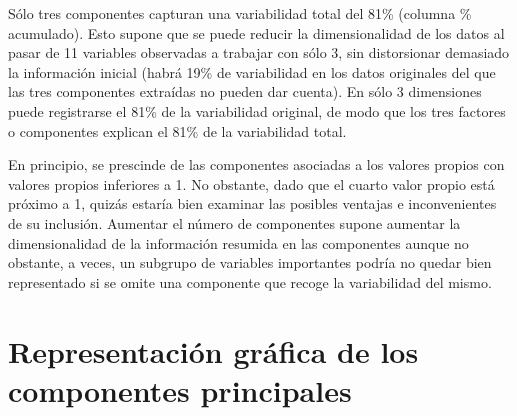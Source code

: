 \documentclass[12pt,twoside]{report}
\begin{document}
Sólo tres componentes capturan una variabilidad total del 81\% (columna \% acumulado). Esto supone que se puede reducir la dimensionalidad de los datos al pasar de 11 variables observadas a trabajar con sólo 3, sin distorsionar demasiado la información inicial (habrá 19\% de variabilidad en los datos originales del que las tres componentes extraídas no pueden dar cuenta). En sólo 3 dimensiones puede registrarse el 81\% de la variabilidad original, de modo que los tres factores o componentes explican el 81\% de la variabilidad total.

En principio, se prescinde de las componentes asociadas a los valores propios con valores propios inferiores a 1. No obstante, dado que el cuarto valor propio está próximo a 1, quizás estaría bien examinar las posibles ventajas e inconvenientes de su inclusión. Aumentar el número de componentes supone aumentar la dimensionalidad de la información resumida en las componentes aunque no obstante, a veces, un subgrupo de variables importantes podría no quedar bien representado si se omite una componente que recoge la variabilidad del mismo.

\section*{Representación gráfica de los componentes principales}
\end{document}
